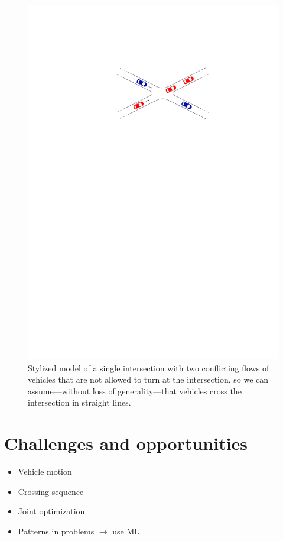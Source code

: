 \documentclass[a4paper]{report}
\theoremstyle{definition}
\theoremstyle{plain}
\begin{document}
\begin{figure}
  \centering
  \includegraphics[scale=1]{figures/intersection-nice}
  \caption{Stylized model of a single intersection with two conflicting flows of
    vehicles that are not allowed to turn at the intersection, so we can
    assume---without loss of generality---that vehicles cross the
    intersection in straight lines.}\label{fig:intersection-nice}
\end{figure}

\section{Challenges and opportunities}

\begin{itemize}
  \item Vehicle motion
  \item Crossing sequence
  \item Joint optimization
  \item Patterns in problems $\rightarrow$ use ML
\end{itemize}
\end{document}
